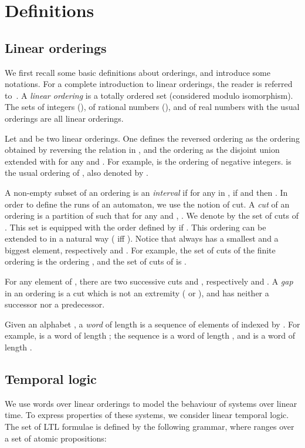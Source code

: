 \documentclass[envcountsame]{fsttcs-ps}
\begin{document}
\section{Definitions}
\label{s:defs}
\subsection{Linear orderings}

We first recall some basic definitions about orderings, and introduce some
notations.  For a complete introduction to linear orderings, the reader is
referred to~\cite{Rosenstein82}.
A \emph{linear ordering}  is a totally ordered set  (considered
modulo isomorphism).
The sets of integers (), of rational numbers (), and of real
numbers with the usual orderings are all linear orderings.


Let  and  be two linear orderings.  One defines the reversed ordering
 as the ordering obtained by reversing the relation  in , and
the ordering  as the disjoint union  extended with  for
any  and .
For example,  is the ordering of negative integers.  
is the usual ordering of , also denoted by .


A non-empty subset  of an ordering  is an \emph{interval} if for any
 in , if  and  then .
In order to define the runs of an automaton, we use the notion of cut.
A \emph{cut} of an ordering  is a partition  of  such that for
any  and , .
We denote by  the set of cuts of .  This set is equipped with the
order defined by  if .  This ordering
can be extended to  in a natural way ( iff ).
Notice that  always has a smallest and a biggest element, respectively
 and .
For example, the set of cuts of the finite ordering  is the
ordering , and the set of cuts of  is .

For any element  of , there are two successive cuts  and
, respectively  and
.    A \emph{gap} in an ordering
 is a cut  which is not an extremity ( or ), and has
neither a successor nor a predecessor.

Given an alphabet , a \emph{word} of length  is a sequence
 of elements of  indexed by .
For example, 
 is a word of length ;
the sequence  is a word of length ,
and
 is a word of length .


\subsection{Temporal logic}

We use words over linear orderings to model the behaviour of systems
over linear time.  To express properties of these systems, we consider
linear temporal logic.
The set of LTL formulae is defined by the following grammar, where  ranges
over a set  of atomic propositions:
\end{document}
